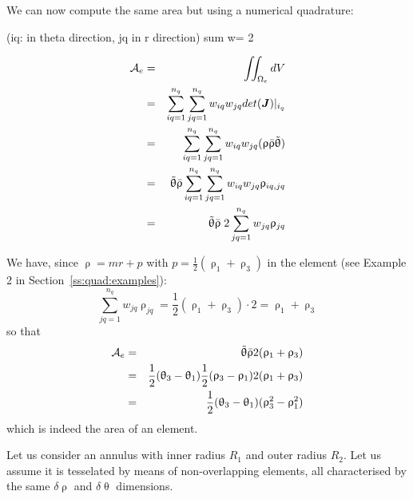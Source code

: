 We can now compute the same area but using a numerical quadrature:


(iq: in theta direction, jq in r direction) sum w= 2 

\begin{eqnarray}
{\cal A}_e
&=&\iint_{\Omega_e} dV  \nonumber\\
&=&\sum_{iq=1}^{n_q} \sum_{jq=1}^{n_q}   w_{iq} w_{jq} det({\bm J})|_{i_q} \nonumber\\
&=&\sum_{iq=1}^{n_q} \sum_{jq=1}^{n_q}   w_{iq} w_{jq} ( \uprho \bar{\uprho} \tilde{\uptheta} ) \nonumber\\
&=& \tilde{\uptheta} \bar{\uprho}  \sum_{iq=1}^{n_q} \sum_{jq=1}^{n_q}   w_{iq} w_{jq} \uprho_{iq,jq} \nonumber\\
&=& \tilde{\uptheta}   \bar{\uprho} \;  2  \sum_{jq=1}^{n_q}  w_{jq} \uprho_{jq} 
\end{eqnarray}

We have, since $\uprho = mr+p $ with $p=\frac12 (\uprho_1+\uprho_3)$ in the element (see Example 2 in Section~\ref{ss:quad:examples}):
\[ 
\sum_{jq=1}^{n_q}  w_{jq} \uprho_{jq} = \frac12 (\uprho_1+\uprho_3)  \cdot 2 = \uprho_1+\uprho_3
\]
so that
\begin{eqnarray}
{\cal A}_e
&=&\tilde{\uptheta}   \bar{\uprho}   2 (\uprho_1+\uprho_3) \nonumber\\
&=&\frac12 (\uptheta_3-\uptheta_1)  \frac12 (\uprho_3-\uprho_1)  2 (\uprho_1+\uprho_3) \nonumber\\
&=&\frac12 (\uptheta_3-\uptheta_1)   (\uprho_3^2-\uprho_1^2) 
\end{eqnarray}
which is indeed the area of an element.













\vspace{.5cm}

Let us consider an annulus with inner radius $R_1$ and outer radius $R_2$. Let us assume it is tesselated 
by means of non-overlapping elements, all characterised by the same $\delta\uprho$ and $\delta\uptheta$ 
dimensions.


